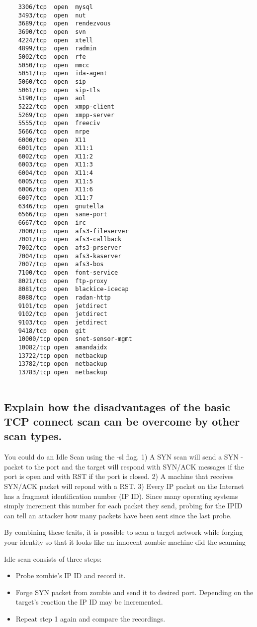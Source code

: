 \begin{lstlisting}
	3306/tcp  open  mysql
	3493/tcp  open  nut
	3689/tcp  open  rendezvous
	3690/tcp  open  svn
	4224/tcp  open  xtell
	4899/tcp  open  radmin
	5002/tcp  open  rfe
	5050/tcp  open  mmcc
	5051/tcp  open  ida-agent
	5060/tcp  open  sip
	5061/tcp  open  sip-tls
	5190/tcp  open  aol
	5222/tcp  open  xmpp-client
	5269/tcp  open  xmpp-server
	5555/tcp  open  freeciv
	5666/tcp  open  nrpe
	6000/tcp  open  X11
	6001/tcp  open  X11:1
	6002/tcp  open  X11:2
	6003/tcp  open  X11:3
	6004/tcp  open  X11:4
	6005/tcp  open  X11:5
	6006/tcp  open  X11:6
	6007/tcp  open  X11:7
	6346/tcp  open  gnutella
	6566/tcp  open  sane-port
	6667/tcp  open  irc
	7000/tcp  open  afs3-fileserver
	7001/tcp  open  afs3-callback
	7002/tcp  open  afs3-prserver
	7004/tcp  open  afs3-kaserver
	7007/tcp  open  afs3-bos
	7100/tcp  open  font-service
	8021/tcp  open  ftp-proxy
	8081/tcp  open  blackice-icecap
	8088/tcp  open  radan-http
	9101/tcp  open  jetdirect
	9102/tcp  open  jetdirect
	9103/tcp  open  jetdirect
	9418/tcp  open  git
	10000/tcp open  snet-sensor-mgmt
	10082/tcp open  amandaidx
	13722/tcp open  netbackup
	13782/tcp open  netbackup
	13783/tcp open  netbackup
	
\end{lstlisting}

\subsection{Explain how the disadvantages of the basic TCP connect scan can be overcome by other scan types.}

You could do an Idle Scan using the -sl flag. 
1) A SYN scan will send a SYN - packet to the port and the target will respond with SYN/ACK messages if the port is open and with RST if the port is closed.
2) A machine that receives SYN/ACK packet will repond with a RST.
3) Every IP packet on the Internet has a fragment identification number (IP ID). Since many operating systems simply increment this number for each packet they send, probing for the IPID can tell an attacker how many packets have been sent since the last probe.

By combining these traits, it is possible to scan a target network while forging your identity so that it looks like an innocent zombie machine did the scanning

Idle scan consists of three steps:
\begin{itemize}
	\item Probe zombie's IP ID and record it.
	\item Forge SYN packet from zombie and send it to desired port. Depending on the target's reaction the IP ID may be incremented.
	\item Repeat step 1 again and compare the recordings.
\end{itemize}

